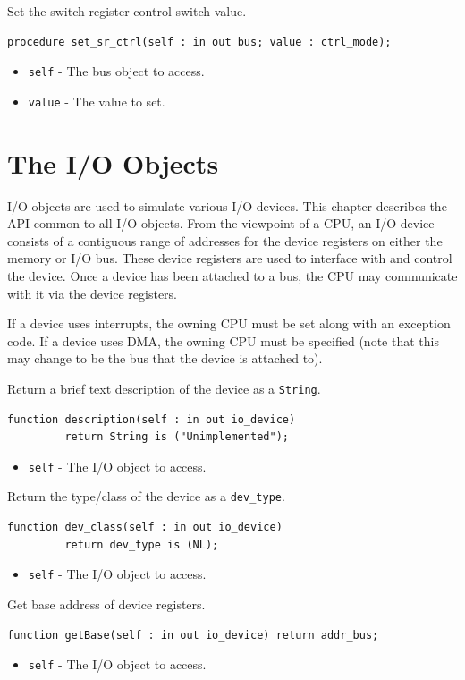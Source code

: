 \documentclass[10pt, openany]{book}
\newcommand{\keyword}[1]{\texttt{#1}}
\newcommand{\datatype}[1]{\texttt{#1}}
\begin{document}
Set the switch register control switch value.
\begin{lstlisting}
procedure set_sr_ctrl(self : in out bus; value : ctrl_mode);
\end{lstlisting}
\begin{itemize}
  \item \keyword{self} - The bus object to access.
  \item \keyword{value} - The value to set.
\end{itemize}

\chapter{The I/O Objects}
\label{chap:IO}
I/O objects are used to simulate various I/O devices.
This chapter describes the API common to all I/O objects.
From the viewpoint of a CPU, an I/O device consists of a contiguous range of addresses for the device registers on either the memory or I/O bus.
These device registers are used to interface with and control the device.
Once a device has been attached to a bus, the CPU may communicate with it via the device registers.

If a device uses interrupts, the owning CPU must be set along with an exception code.
If a device uses DMA, the owning CPU must be specified (note that this may change to be the bus that the device is attached to).

Return a brief text description of the device as a \datatype{String}.
\begin{lstlisting}
function description(self : in out io_device)
         return String is ("Unimplemented");
\end{lstlisting}
\begin{itemize}
  \item \keyword{self} - The I/O object to access.
\end{itemize}

Return the type/class of the device as a \datatype{dev\_type}.
\begin{lstlisting}
function dev_class(self : in out io_device)
         return dev_type is (NL);
\end{lstlisting}
\begin{itemize}
  \item \keyword{self} - The I/O object to access.
\end{itemize}

Get base address of device registers.
\begin{lstlisting}
function getBase(self : in out io_device) return addr_bus;
\end{lstlisting}
\begin{itemize}
  \item \keyword{self} - The I/O object to access.
\end{itemize}
\end{document}
